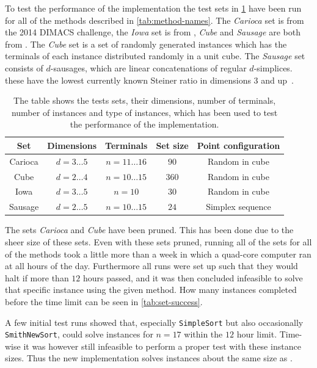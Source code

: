 To test the performance of the implementation the test sets in
\cref{tab:test-sets} have been run for all of the methods described in
\cref{tab:method-names}. The \textit{Carioca} set is from the 2014 DIMACS
challenge, the \textit{Iowa} set is from \textcite{fampa2008}, \textit{Cube} and
\textit{Sausage} are both from \textcite{fonseca2014}. The \textit{Cube} set is
a set of randomly generated instances which has the terminals of each instance
distributed randomly in a unit cube. The \textit{Sausage} set consists of
$d$-sausages, which are linear concatenations of regular $d$-simplices. these
have the lowest currently known Steiner ratio in dimensions $3$ and
up~\cite{smith1995}.

\begin{table}[htbp]
  \centering
  \begin{tabular}{ccccc}
    \toprule
    Set     & Dimensions       & Terminals             & Set size & Point configuration \\
    \midrule
    Carioca & $d = 3 \ldots 5$ & $n = 11 \ldots 16$    & $90$     & Random in cube      \\
    Cube    & $d = 2 \ldots 4$ & $n = 10 \ldots 15$    & $360$    & Random in cube      \\
    Iowa  & $d = 3 \ldots 5$ & $n = 10$              & $30$     & Random in cube      \\
    Sausage & $d = 2 \ldots 5$ & $n = 10 \ldots 15$    & $24$     & Simplex sequence    \\
    \bottomrule
  \end{tabular}
  \caption[Test sets used to test performance]{The table shows the tests sets,
    their dimensions, number of terminals, number of instances and type of instances,
    which has been used to test the performance of the implementation.\label{tab:test-sets}}
\end{table}

The sets \textit{Carioca} and \textit{Cube} have been pruned. This has been done
due to the sheer size of these sets. Even with these sets pruned, running all of
the sets for all of the methods took a little more than a week in which a
quad-core computer ran at all hours of the day. Furthermore all runs were set up such that
they would halt if more than $12$ hours passed, and it was then concluded
infeasible to solve that specific instance using the given method. How many
instances completed before the time limit can be seen in \cref{tab:set-success}.

A few initial test runs showed that, especially \texttt{SimpleSort} but also
occasionally \texttt{SmithNewSort}, could solve instances for $n=17$ within the
$12$ hour limit. Time-wise it was however still infeasible to perform a proper
test with these instance sizes. Thus the new implementation solves instances
about the same size as \textcite{fonseca2014}.

